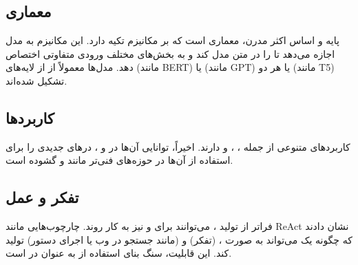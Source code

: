 \subsection{معماری}
پایه و اساس اکثر  مدرن، معماری  است که بر مکانیزم  تکیه دارد. این مکانیزم به مدل اجازه می‌دهد تا  را در متن مدل کند و به بخش‌های مختلف ورودی  متفاوتی اختصاص دهد. مدل‌ها معمولاً از  از لایه‌های  (مانند BERT) یا  (مانند GPT) یا هر دو (مانند T5) تشکیل شده‌اند.

\subsection{کاربردها}
 کاربردهای متنوعی از جمله ، ،  و  دارند. اخیراً، توانایی آن‌ها در  و ، درهای جدیدی را برای استفاده از آن‌ها در حوزه‌های فنی‌تر مانند  و  گشوده است.

\subsection{تفکر و عمل}
فراتر از تولید ،  می‌توانند برای  و  نیز به کار روند. چارچوب‌هایی مانند ReAct \cite{yao2023react} نشان دادند که چگونه یک  می‌تواند به صورت ،  (تفکر) و  (مانند جستجو در وب یا اجرای دستور) تولید کند. این قابلیت، سنگ بنای استفاده از  به عنوان  در  است.

